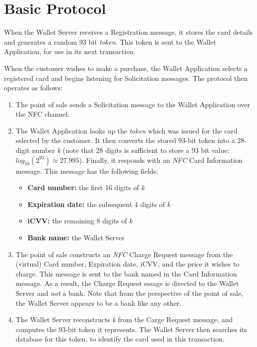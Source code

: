 \section{Basic Protocol}
\label{unlinkable-design-1}

When the Wallet Server receives a Registration message, it stores the card details and generates a random 93 bit \emph{token}.
This token is sent to the Wallet Application, for use in its next transaction.

When the customer wishes to make a purchase, the Wallet Application selects a registered card and begins listening for Solicitation messages.
The protocol then operates as follows:
\begin{enumerate}
\item The point of sale sends a Solicitation message to the Wallet Application over the NFC channel.
\item The Wallet Application looks up the \emph{token} which was issued for the card selected by the customer.
    It then converts the stored 93-bit token into a 28-digit number \emph{k}
    (note that 28 digits is sufficient to store a 93 bit value: $log_{10}(2^{93}) \approx 27.995$).
    Finally, it responds with an \emph{NFC} Card Information message.
    This message has the following fields:
    \begin{itemize}
    \item \textbf{Card number:} the first 16 digits of \emph{k}
    \item \textbf{Expiration date:} the subsequent 4 digits of \emph{k}
    \item \textbf{iCVV:} the remaining 8 digits of \emph{k}
    \item \textbf{Bank name:} the Wallet Server
   	\end{itemize}
\item The point of sale constructs an \emph{NFC} Charge Request message from the (virtual) Card number, Expiration date, iCVV, and the price it wishes to charge.
	This message is sent to the bank named in the Card Information message.
    As a result, the Charge Request essage is directed to the Wallet Server and \emph{not} a bank.
    Note that from the perspective of the point of sale, the Wallet Server appears to be a bank like any other.
\item The Wallet Server reconstructs \emph{k} from the Carge Request message, and computes the 93-bit token it represents.
    The Wallet Server then searches its database for this token, to identify the card used in this transaction.

\end{enumerate}
